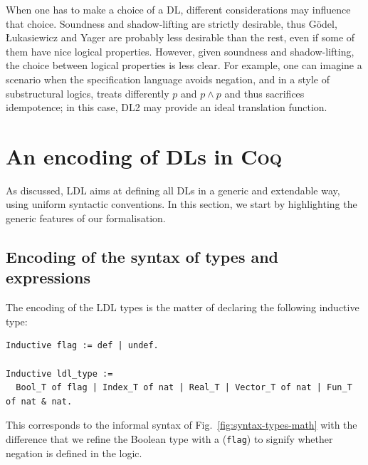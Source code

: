 \documentclass[a4paper,UKenglish,cleveref, autoref, thm-restate]{lipics-v2021}
\def\coqin#1{\texttt{#1}}
\def\DLtwo{\textrm{DL2}}
\def\Yager{\textrm{Yager}}
\def\Luka{\textrm{Łukasiewicz}}
\def\Godel{\textrm{Gödel}}
\def\coq{\textsc{Coq}}
\begin{document}
When one has to make a choice of a DL, different considerations may influence that choice.
Soundness and shadow-lifting are strictly desirable, thus \Godel{}, \Luka{} 
and \Yager{} are probably less desirable than the rest, even if some of them have nice logical properties.  
However, given soundness and shadow-lifting, the choice between logical properties is less clear.
For example, one can imagine a scenario when the specification
language avoids negation,
and in a style of substructural logics,
 treats differently $p$ and $p \land p$ and thus sacrifices idempotence; in this case, 
\DLtwo{} may
provide an ideal translation function.

\section{An encoding of DLs in \coq}
\label{sec:syntax}

As discussed, LDL aims at defining all DLs in a generic and extendable
way, using uniform syntactic conventions.  In this section, we start
by highlighting the generic features of our formalisation.

\subsection{Encoding of the syntax of types and expressions}

The encoding of the LDL types is the matter of declaring the following
inductive type:
\begin{verbatim}
Inductive flag := def | undef.

Inductive ldl_type :=
  Bool_T of flag | Index_T of nat | Real_T | Vector_T of nat | Fun_T of nat & nat.
\end{verbatim}
This corresponds to the informal syntax of
Fig.~\ref{fig:syntax-types-math} with the difference that we refine the Boolean type with a (\coqin{flag}) to
signify whether negation is defined in the logic. 
\end{document}
